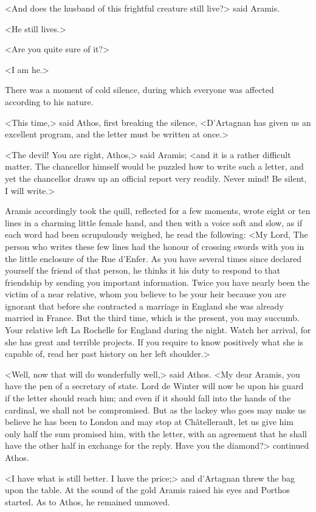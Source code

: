 <And does the husband of this frightful creature still live?> said Aramis. 

<He still lives.> 

<Are you quite sure of it?> 

<I am he.> 

There was a moment of cold silence, during which everyone was affected according to his nature. 

<This time,> said Athos, first breaking the silence, <D'Artagnan has given us an excellent program, and the letter must be written at once.> 

<The devil! You are right, Athos,> said Aramis; <and it is a rather difficult matter. The chancellor himself would be puzzled how to write such a letter, and yet the chancellor draws up an official report very readily. Never mind! Be silent, I will write.> 

Aramis accordingly took the quill, reflected for a few moments, wrote eight or ten lines in a charming little female hand, and then with a voice soft and slow, as if each word had been scrupulously weighed, he read the following: <My Lord, The person who writes these few lines had the honour of crossing swords with you in the little enclosure of the Rue d'Enfer. As you have several times since declared yourself the friend of that person, he thinks it his duty to respond to that friendship by sending you important information. Twice you have nearly been the victim of a near relative, whom you believe to be your heir because you are ignorant that before she contracted a marriage in England she was already married in France. But the third time, which is the present, you may succumb. Your relative left La Rochelle for England during the night. Watch her arrival, for she has great and terrible projects. If you require to know positively what she is capable of, read her past history on her left shoulder.> 

<Well, now that will do wonderfully well,> said Athos. <My dear Aramis, you have the pen of a secretary of state. Lord de Winter will now be upon his guard if the letter should reach him; and even if it should fall into the hands of the cardinal, we shall not be compromised. But as the lackey who goes may make us believe he has been to London and may stop at Châtellerault, let us give him only half the sum promised him, with the letter, with an agreement that he shall have the other half in exchange for the reply. Have you the diamond?> continued Athos. 

<I have what is still better. I have the price;> and d'Artagnan threw the bag upon the table. At the sound of the gold Aramis raised his eyes and Porthos started. As to Athos, he remained unmoved. 

